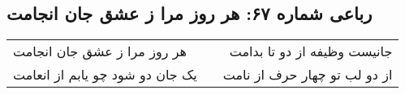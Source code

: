 \begin{center}
\section*{رباعی شماره ۶۷: هر روز مرا ز عشق جان انجامت}
\label{sec:sh067}
\begin{longtable}{l p{0.5cm} r}
هر روز مرا ز عشق جان انجامت
&&
جانیست وظیفه از دو تا بدامت
\\
یک جان دو شود چو یابم از انعامت
&&
از دو لب تو چهار حرف از نامت
\\
\end{longtable}
\end{center}
